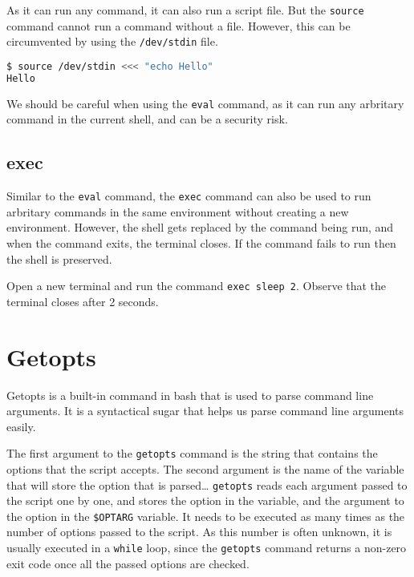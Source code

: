 As it can run any command, it can also run a script file. But the \lstinline|source| command cannot run a command without a file.
However, this can be circumvented by using the \lstinline|/dev/stdin| file.

\begin{lstlisting}[language=bash]
$ source /dev/stdin <<< "echo Hello"
Hello
\end{lstlisting}

\begin{warn}
  We should be careful when using the \lstinline|eval| command, as it can run any arbritary command in the current shell, and can be a security risk.
\end{warn}

\subsection{exec}

Similar to the \lstinline|eval| command, the \lstinline|exec| command can also be used to run arbritary commands in the same environment without creating a new environment.
However, the shell gets replaced by the command being run, and when the command exits, the terminal closes. If the command fails to run then the shell is preserved.

\begin{exercise}
  Open a new terminal and run the command \lstinline|exec sleep 2|.
  Observe that the terminal closes after 2 seconds.
\end{exercise}


\section{Getopts}

Getopts is a built-in command in bash that is used to parse command line arguments.
It is a syntactical sugar that helps us parse command line arguments easily.

  The first argument to the \lstinline|getopts| command is the string that contains the options that the script accepts.
  The second argument is the name of the variable that will store the option that is parsed\dots
  \lstinline|getopts| reads each argument passed to the script one by one, and stores the option in the variable, and the argument to the option in the \lstinline|$OPTARG| variable.
  It needs to be executed as many times as the number of options passed to the script.
  As this number is often unknown, it is usually executed in a \lstinline|while| loop, since the \lstinline|getopts| command returns a non-zero exit code once all the passed options are checked.

